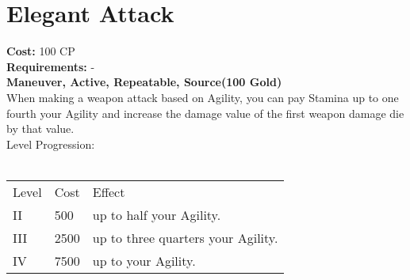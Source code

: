 \section{Elegant Attack}
\textbf{Cost:} 100 CP\\
\textbf{Requirements:} -\\
\textbf{Maneuver, Active, Repeatable, Source(100 Gold)}\\
When making a weapon attack based on Agility, you can pay Stamina up to one fourth your Agility and increase the damage value of the first weapon damage die by that value.
\\
Level Progression:\\
\\
\begin{tabular}{l | l | l}
	Level & Cost & Effect\\
	II & 500 & up to half your Agility.\\
	III & 2500 & up to three quarters your Agility.\\
	IV & 7500 & up to your Agility.\\
\end{tabular}